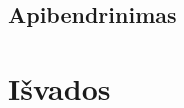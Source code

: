 \documentclass[oneside]{VUMIFPSkursinis}
\begin{document}
\begin{center}
\begin{tabular}{ |p{4cm}| p{6cm} | p{7cm} | }
	
	
	
   \hline
    \end{tabular}
\end{center}

\pagebreak
	\subsection{Apibendrinimas}
\iffalse XXXXXXXXXXXXXXXXXXXXXXXXXXXXXXXXXXXXXXXXXXXXXXXXXXXXXXXXXXXXXXXXXXXXXXXXXXXXXXXXXXXXXXXXXXXXXXXXXXXXXXXXXXXXXXXXXXXXXXXXXXXXXXXXXXXXXXX \fi
\section{Išvados}
\end{document}

